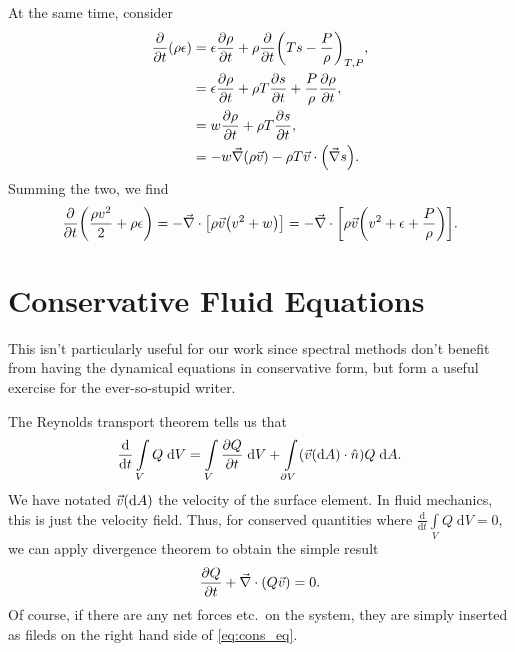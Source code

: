 \documentclass[11pt,
        usenames, %
        dvipsnames %
    ]{report}
\newcommand*{\rd}[2]{\frac{\mathrm{d}#1}{\mathrm{d}#2}}
\newcommand*{\pd}[2]{\frac{\partial#1}{\partial#2}}
\DeclarePairedDelimiter\p{\lparen}{\rparen}
\DeclarePairedDelimiter\s{\lbrack}{\rbrack}
\begin{document}
At the same time, consider
\begin{align}
    \pd{}{t}\p*{\rho \epsilon} &= \epsilon \pd{\rho}{t}
        + \rho \pd{}{t}\p*{Ts - \frac{P}{\rho}}_{T, P},\nonumber\\
        &= \epsilon \pd{\rho}{t} + \rho T \pd{s}{t} + \frac{P}{\rho}\pd{\rho}{t}
            ,\nonumber\\
        &= w \pd{\rho}{t} + \rho T \pd{s}{t},\nonumber\\
        &= -w\vec{\nabla}\p*{\rho \vec{v}} - \rho T \vec{v} \cdot \p*{
            \vec{\nabla}s
        }.
\end{align}
Summing the two, we find
\begin{equation}
    \pd{}{t}\p*{\frac{\rho v^2}{2} + \rho \epsilon}
        = -\vec{\nabla} \cdot \s*{
            \rho \vec{v}\p*{v^2 + w}
        } = -\vec{\nabla} \cdot \s*{
            \rho \vec{v}\p*{v^2 + \epsilon + \frac{P}{\rho}}
        }.
\end{equation}

\section{Conservative Fluid Equations}

This isn't particularly useful for our work since spectral methods don't benefit
from having the dynamical equations in conservative form, but form a useful
exercise for the ever-so-stupid writer.

The Reynolds transport theorem tells us that
\begin{equation}
    \rd{}{t}\int\limits_V Q\;\mathrm{d}V
        = \int\limits_V \pd{Q}{t}\;\mathrm{d}V
            + \int\limits_{\partial V}
                \p*{\vec{v}\p*{\mathrm{d}A} \cdot \hat{n}} Q\;\mathrm{d}A.
\end{equation}
We have notated $\vec{v}\p*{\mathrm{d}A}$ the velocity of the surface element.
In fluid mechanics, this is just the velocity field. Thus, for conserved
quantities where $\rd{}{t}\int\limits_V Q\;\mathrm{d}V = 0$, we can apply
divergence theorem to obtain the simple result
\begin{equation}
    \pd{Q}{t} + \vec{\nabla} \cdot \p*{Q\vec{v}} = 0.\label{eq:cons_eq}
\end{equation}
Of course, if there are any net forces etc.\ on the system, they are simply
inserted as fileds on the right hand side of \autoref{eq:cons_eq}.
\end{document}
